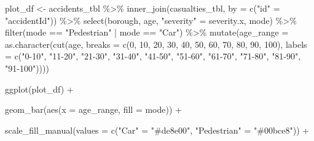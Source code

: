 \documentclass[
]{article}
\newenvironment{Shaded}{\begin{snugshade}}{\end{snugshade}}
\newcommand{\AttributeTok}[1]{\textcolor[rgb]{0.77,0.63,0.00}{#1}}
\newcommand{\DecValTok}[1]{\textcolor[rgb]{0.00,0.00,0.81}{#1}}
\newcommand{\FunctionTok}[1]{\textcolor[rgb]{0.00,0.00,0.00}{#1}}
\newcommand{\NormalTok}[1]{#1}
\newcommand{\OtherTok}[1]{\textcolor[rgb]{0.56,0.35,0.01}{#1}}
\newcommand{\SpecialCharTok}[1]{\textcolor[rgb]{0.00,0.00,0.00}{#1}}
\newcommand{\StringTok}[1]{\textcolor[rgb]{0.31,0.60,0.02}{#1}}
\begin{document}
\begin{Shaded}
\begin{Highlighting}[]
\NormalTok{plot\_df }\OtherTok{\textless{}{-}}\NormalTok{ accidents\_tbl }\SpecialCharTok{\%\textgreater{}\%} 
    \FunctionTok{inner\_join}\NormalTok{(casualties\_tbl, }\AttributeTok{by =} \FunctionTok{c}\NormalTok{(}\StringTok{"id"} \OtherTok{=} \StringTok{"accidentId"}\NormalTok{)) }\SpecialCharTok{\%\textgreater{}\%}
    \FunctionTok{select}\NormalTok{(borough, age, }\StringTok{"severity"} \OtherTok{=}\NormalTok{ severity.x, mode) }\SpecialCharTok{\%\textgreater{}\%}
    \FunctionTok{filter}\NormalTok{(mode }\SpecialCharTok{==} \StringTok{"Pedestrian"} \SpecialCharTok{|}\NormalTok{ mode }\SpecialCharTok{==} \StringTok{"Car"}\NormalTok{) }\SpecialCharTok{\%\textgreater{}\%}
    \FunctionTok{mutate}\NormalTok{(}\AttributeTok{age\_range =} \FunctionTok{as.character}\NormalTok{(}\FunctionTok{cut}\NormalTok{(age,}
                                        \AttributeTok{breaks =} \FunctionTok{c}\NormalTok{(}\DecValTok{0}\NormalTok{, }\DecValTok{10}\NormalTok{, }\DecValTok{20}\NormalTok{, }\DecValTok{30}\NormalTok{, }\DecValTok{40}\NormalTok{, }\DecValTok{50}\NormalTok{,}
                                                   \DecValTok{60}\NormalTok{, }\DecValTok{70}\NormalTok{, }\DecValTok{80}\NormalTok{, }\DecValTok{90}\NormalTok{, }\DecValTok{100}\NormalTok{),}
                                        \AttributeTok{labels =} \FunctionTok{c}\NormalTok{(}\StringTok{"0{-}10"}\NormalTok{, }\StringTok{"11{-}20"}\NormalTok{,}
                                                   \StringTok{"21{-}30"}\NormalTok{, }\StringTok{"31{-}40"}\NormalTok{,}
                                                   \StringTok{"41{-}50"}\NormalTok{, }\StringTok{"51{-}60"}\NormalTok{,}
                                                   \StringTok{"61{-}70"}\NormalTok{, }\StringTok{"71{-}80"}\NormalTok{,}
                                                   \StringTok{"81{-}90"}\NormalTok{, }\StringTok{"91{-}100"}\NormalTok{))))}
  
  \FunctionTok{ggplot}\NormalTok{(plot\_df) }\SpecialCharTok{+}
    
    \FunctionTok{geom\_bar}\NormalTok{(}\FunctionTok{aes}\NormalTok{(}\AttributeTok{x =}\NormalTok{ age\_range, }
                 \AttributeTok{fill =}\NormalTok{ mode)) }\SpecialCharTok{+}
    
    \FunctionTok{scale\_fill\_manual}\NormalTok{(}\AttributeTok{values =} \FunctionTok{c}\NormalTok{(}\StringTok{"Car"} \OtherTok{=} \StringTok{"\#de8e00"}\NormalTok{,}
                                 \StringTok{"Pedestrian"} \OtherTok{=} \StringTok{"\#00bce8"}\NormalTok{)) }\SpecialCharTok{+}
    

\end{Highlighting}
\end{Shaded}
\end{document}
